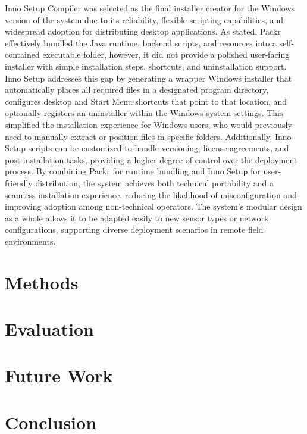 \documentclass{article}
\begin{document}
Inno Setup Compiler was selected as the final installer creator for the Windows version of the system due to its reliability, flexible scripting capabilities, and widespread adoption for distributing desktop applications. As stated, Packr effectively bundled the Java runtime, backend scripts, and resources into a self-contained executable folder, however, it did not provide a polished user-facing installer with simple installation steps, shortcuts, and uninstallation support. Inno Setup addresses this gap by generating a wrapper Windows installer that automatically places all required files in a designated program directory, configures desktop and Start Menu shortcuts that point to that location, and optionally registers an uninstaller within the Windows system settings. This simplified the installation experience for Windows users, who would previously need to manually extract or position files in specific folders. Additionally, Inno Setup scripts can be customized to handle versioning, license agreements, and post-installation tasks, providing a higher degree of control over the deployment process. By combining Packr for runtime bundling and Inno Setup for user-friendly distribution, the system achieves both technical portability and a seamless installation experience, reducing the likelihood of misconfiguration and improving adoption among non-technical operators. The system’s modular design as a whole allows it to be adapted easily to new sensor types or network configurations, supporting diverse deployment scenarios in remote field environments.\\

\section{Methods}

\section{Evaluation}

\section{Future Work}

\section{Conclusion}

\end{document}

